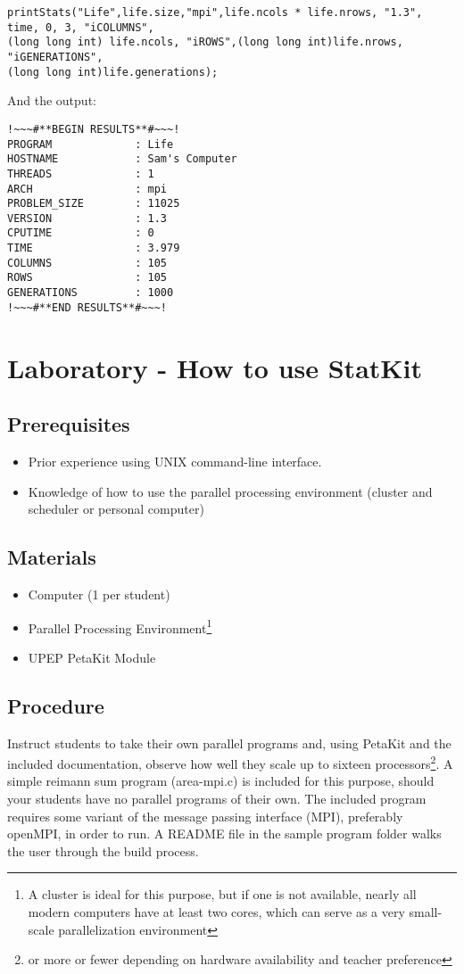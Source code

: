 \documentclass[12pt]{article}
\begin{document}
\begin{verbatim}
printStats("Life",life.size,"mpi",life.ncols * life.nrows, "1.3", time, 0, 3, "iCOLUMNS",
(long long int) life.ncols, "iROWS",(long long int)life.nrows, "iGENERATIONS",
(long long int)life.generations);
\end{verbatim}

And the output:
\singlespacing
\begin{verbatim}
!~~~#**BEGIN RESULTS**#~~~!
PROGRAM             : Life
HOSTNAME            : Sam's Computer
THREADS             : 1
ARCH                : mpi
PROBLEM_SIZE        : 11025
VERSION             : 1.3
CPUTIME             : 0
TIME                : 3.979
COLUMNS             : 105
ROWS                : 105
GENERATIONS         : 1000
!~~~#**END RESULTS**#~~~!
\end{verbatim}

\doublespacing
\clearpage
\section{Laboratory - How to use StatKit}
\subsection{Prerequisites}
\begin{itemize}
\item Prior experience using UNIX command-line interface.
\item Knowledge of how to use the parallel processing environment (cluster and scheduler or personal computer)
\end{itemize}

\subsection{Materials}
\begin{itemize}
\item Computer (1 per student)
\item Parallel Processing Environment\footnote{A cluster is ideal for this purpose, but if one is not available, nearly all modern computers have at least two cores, which can serve as a very small-scale parallelization environment}
\item UPEP PetaKit Module
\end{itemize}

\subsection{Procedure}
Instruct students to take their own parallel programs and, using PetaKit and the included documentation, observe how well they scale up to sixteen processors\footnote{or more or fewer depending on hardware availability and teacher preference}. 
A simple reimann sum program (area-mpi.c) is included for this purpose, should your students have no parallel programs of their own. The included program requires some variant of the message passing interface (MPI), preferably openMPI, in order to run. A README file in the sample program folder walks the user through the build process.
\end{document}
